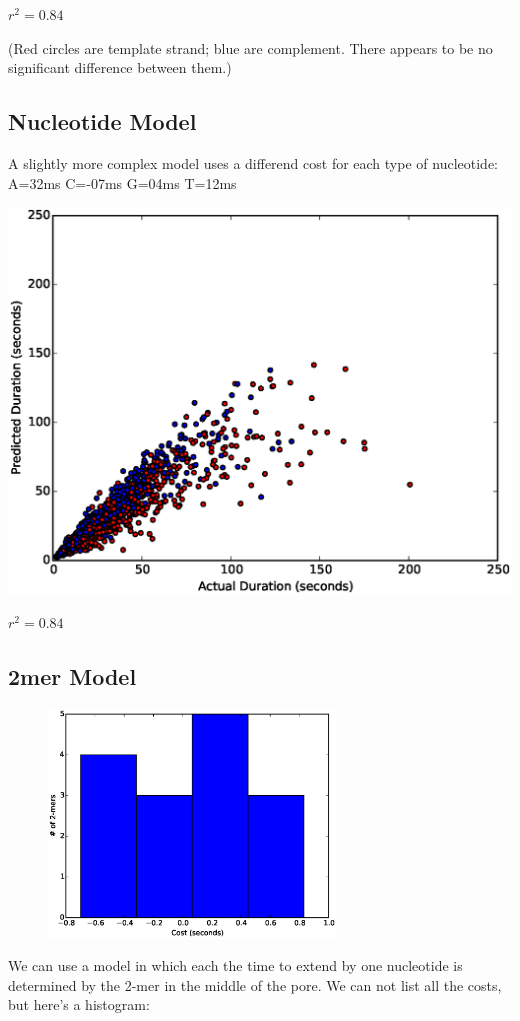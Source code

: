 $r^2=0.84$


(Red circles are template strand; blue are complement.  There appears to be no significant difference between them.)

\newpage
\subsection*{Nucleotide Model}
A slightly more complex model uses a differend cost for each type of nucleotide: 
A=32ms 
C=-07ms 
G=04ms 
T=12ms 


\includegraphics[width=\textwidth]{part11scatter1mer}

$r^2=0.84$


        \newpage
        \subsection*{2mer Model}
        \begin{figure}
        \vspace{-50pt}
        \includegraphics[width=3in]{part11hist2}
        \vspace{-70pt}
        \end{figure}
        We can use a model in which each the time to extend by one nucleotide is determined by the 2-mer in the middle of the
        pore.  We can not list all the costs, but here's a histogram:

